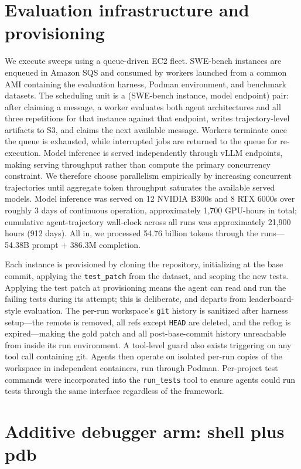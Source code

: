 \section{Evaluation infrastructure and provisioning}
\label{app:infra}
We execute sweeps using a queue-driven EC2 fleet. SWE-bench instances are enqueued in Amazon SQS and consumed by workers launched from a common AMI containing the evaluation harness, Podman environment, and benchmark datasets. The scheduling unit is a (SWE-bench instance, model endpoint) pair: after claiming a message, a worker evaluates both agent architectures and all three repetitions for that instance against that endpoint, writes trajectory-level artifacts to S3, and claims the next available message. Workers terminate once the queue is exhausted, while interrupted jobs are returned to the queue for re-execution. Model inference is served independently through vLLM endpoints, making serving throughput rather than compute the primary concurrency constraint. We therefore choose parallelism empirically by increasing concurrent trajectories until aggregate token throughput saturates the available served models. Model inference was served on 12 NVIDIA B300s and 8 RTX 6000s over roughly 3 days of continuous operation, approximately 1{,}700 GPU-hours in total; cumulative agent-trajectory wall-clock across all runs was approximately 21{,}900 hours (912 days). All in, we processed 54.76 billion tokens through the runs---54.38B prompt + 386.3M completion.

Each instance is provisioned by cloning the repository, initializing at the base commit, applying the \texttt{test\_patch} from the dataset, and scoping the new tests. Applying the test patch at provisioning means the agent can read and run the failing tests during its attempt; this is deliberate, and departs from leaderboard-style evaluation. The per-run workspace's \texttt{git} history is sanitized after harness setup---the remote is removed, all refs except \texttt{HEAD} are deleted, and the reflog is expired---making the gold patch and all post-base-commit history unreachable from inside its run environment. A tool-level guard also exists triggering on any tool call containing git. Agents then operate on isolated per-run copies of the workspace in independent containers, run through Podman. Per-project test commands were incorporated into the \texttt{run\_tests} tool to ensure agents could run tests through the same interface regardless of the framework.


\section{Additive debugger arm: shell plus pdb}
\label{app:pdb_shell}

